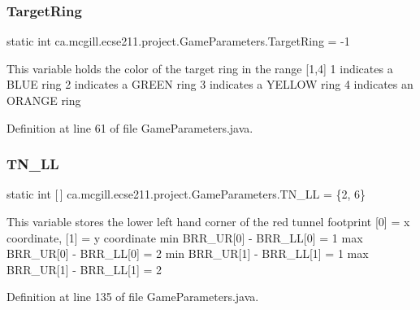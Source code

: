 \subsubsection{\texorpdfstring{Target\+Ring}{TargetRing}}
{\footnotesize\ttfamily  static  int ca.\+mcgill.\+ecse211.\+project.\+Game\+Parameters.\+Target\+Ring = -\/1\hspace{0.3cm}{\ttfamily [static]}}

This variable holds the color of the target ring in the range \mbox{[}1,4\mbox{]} 1 indicates a B\+L\+UE ring 2 indicates a G\+R\+E\+EN ring 3 indicates a Y\+E\+L\+L\+OW ring 4 indicates an O\+R\+A\+N\+GE ring 

Definition at line 61 of file Game\+Parameters.\+java.

\mbox{\label{enumca_1_1mcgill_1_1ecse211_1_1project_1_1_game_parameters_aff67c7474a260a8bcbb245a7c7d5b009}} 
\subsubsection{\texorpdfstring{T\+N\+\_\+\+LL}{TN\_LL}}
{\footnotesize\ttfamily  static  int \mbox{[}$\,$\mbox{]} ca.\+mcgill.\+ecse211.\+project.\+Game\+Parameters.\+T\+N\+\_\+\+LL = \{2, 6\}\hspace{0.3cm}{\ttfamily [static]}}

This variable stores the lower left hand corner of the red tunnel footprint \mbox{[}0\mbox{]} = x coordinate, \mbox{[}1\mbox{]} = y coordinate min B\+R\+R\+\_\+\+UR\mbox{[}0\mbox{]} -\/ B\+R\+R\+\_\+\+LL\mbox{[}0\mbox{]} = 1 max B\+R\+R\+\_\+\+UR\mbox{[}0\mbox{]} -\/ B\+R\+R\+\_\+\+LL\mbox{[}0\mbox{]} = 2 min B\+R\+R\+\_\+\+UR\mbox{[}1\mbox{]} -\/ B\+R\+R\+\_\+\+LL\mbox{[}1\mbox{]} = 1 max B\+R\+R\+\_\+\+UR\mbox{[}1\mbox{]} -\/ B\+R\+R\+\_\+\+LL\mbox{[}1\mbox{]} = 2 

Definition at line 135 of file Game\+Parameters.\+java.

\mbox{\label{enumca_1_1mcgill_1_1ecse211_1_1project_1_1_game_parameters_aa47abaface63a254570f9a82c4e1fe0d}} 
